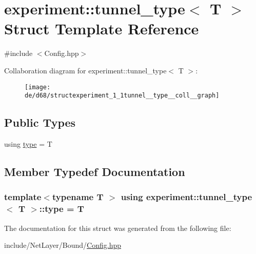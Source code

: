 \hypertarget{structexperiment_1_1tunnel__type}{}\section{experiment\+:\+:tunnel\+\_\+type$<$ T $>$ Struct Template Reference}
\label{structexperiment_1_1tunnel__type}


{\ttfamily \#include $<$Config.\+hpp$>$}



Collaboration diagram for experiment\+:\+:tunnel\+\_\+type$<$ T $>$\+:\nopagebreak
\begin{figure}[H]
\begin{center}
\leavevmode
\texttt{[image: de/d68/structexperiment\_1\_1tunnel\_\_type\_\_coll\_\_graph]}
\end{center}
\end{figure}
\subsection*{Public Types}
\begin{DoxyCompactItemize}
\item 
using \hyperlink{structexperiment_1_1tunnel__type_ae92e1911b9caf78c4477eefabd032b37}{type} = T
\end{DoxyCompactItemize}


\subsection{Member Typedef Documentation}
\hypertarget{structexperiment_1_1tunnel__type_ae92e1911b9caf78c4477eefabd032b37}{}
\subsubsection[{type}]{\setlength{\rightskip}{0pt plus 5cm}template$<$typename T $>$ using {\bf experiment\+::tunnel\+\_\+type}$<$ T $>$\+::{\bf type} =  T}\label{structexperiment_1_1tunnel__type_ae92e1911b9caf78c4477eefabd032b37}


The documentation for this struct was generated from the following file\+:\begin{DoxyCompactItemize}
\item 
include/\+Net\+Layer/\+Bound/\hyperlink{Config_8hpp}{Config.\+hpp}\end{DoxyCompactItemize}
